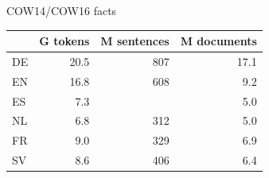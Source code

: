 \begin{frame}
  {COW14\slash COW16 facts}
  \begin{center}
    \begin{tabular}[h]{lrrr}
      \hline
            & G tokens & M sentences & M documents \\
      \hline
      \hline
      DE & 20.5 & 807 & 17.1 \\
      EN & 16.8 & 608 & 9.2 \\
      ES & 7.3 & &      5.0 \\
      NL & 6.8 & 312 &  5.0 \\
      FR & 9.0 & 329 &  6.9 \\
      SV & 8.6 & 406 &  6.4 \\
      \hline
    \end{tabular}
  \end{center}
\end{frame}


